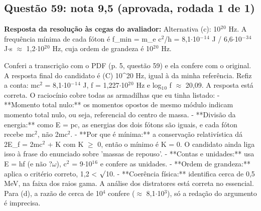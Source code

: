 \documentclass{article}%
\begin{document}
\subsection*{Questão 59: nota 9,5 (aprovada, rodada 1 de 1)}%
\textbf{Resposta da resolução às cegas do avaliador:} Alternativa (c): 10$^2$$^{0}$ Hz. A frequência mínima de cada fóton é f\_min = m\_e c$^2$/h = 8,1$\cdot$10$^{-}$$^{1}$$^{4}$ J / 6,6$\cdot$10$^{-}$$^3$$^{4}$ J$\cdot$s $\approx$ 1,2$\cdot$10$^2$$^{0}$ Hz, cuja ordem de grandeza é 10$^2$$^{0}$ Hz.\par %
Conferi a transcrição com o PDF (p. 5, questão 59) e ela confere com o original. A resposta final do candidato é (C) 10\^{}20 Hz, igual à da minha referência. Refiz a conta: mc$^2$ = 8,1$\cdot$10$^{-}$$^{1}$$^{4}$ J, f = 1,227$\cdot$10$^2$$^{0}$ Hz e log$_{1}$$_{0}$ f $\approx$ 20,09. A resposta está correta.\newline%
\newline%
O raciocínio cobre todas as armadilhas que eu tinha listado:\newline%
{-} **Momento total nulo:** os momentos opostos de mesmo módulo indicam momento total nulo, ou seja, referencial do centro de massa.\newline%
{-} **Divisão da energia:** como E = pc, as energias dos dois fótons são iguais, e cada fóton recebe mc$^2$, não 2mc$^2$.\newline%
{-} **Por que é mínima:** a conservação relativística dá 2E\_f = 2mc$^2$ + K com K $\geq$ 0, então o mínimo é K = 0. O candidato ainda liga isso à frase do enunciado sobre 'massas de repouso'.\newline%
{-} **Contas e unidades:** usa E = hf (e não ?$\omega$), c$^2$ = 9$\cdot$10$^{1}$$^{6}$ e confere as unidades.\newline%
{-} **Ordem de grandeza:** aplica o critério correto, 1,2 < $\surd$10.\newline%
{-} **Coerência física:** identifica cerca de 0,5 MeV, na faixa dos raios gama.\newline%
\newline%
A análise dos distratores está correta no essencial. Para (d), a razão de cerca de 10$^{4}$ confere ($\approx$ 8,1$\cdot$10$^3$), só a redação do argumento é imprecisa.\newline%
\newline%
\end{document}
